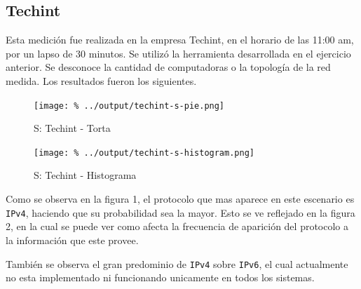 \documentclass[final,narroweqnarray,inline]{ieee}
\begin{document}
    \subsection{Techint}

    Esta medición fue realizada en la empresa Techint, en el horario de
    las 11:00 am, por un lapso de 30 minutos. Se utilizó la herramienta
    desarrollada en el ejercicio anterior. Se desconoce la cantidad de
    computadoras o la topología de la red medida. Los resultados fueron
    los siguientes.
    
    
    \begin{figure}[H]\begin{center}
      \texttt{[image: \%
      ../output/techint-s-pie.png]}
      \vspace{-3em}
      \caption{S: Techint - Torta}
      \label{techint-s-pie}
    \end{center}\end{figure}
 
     
    \begin{figure}[H]\begin{center}
      \texttt{[image: \%
      ../output/techint-s-histogram.png]}
      \caption{S: Techint - Histograma}
      \label{techint-s-histogram}
    \end{center}\end{figure}


    Como se observa en la figura 1, el protocolo que mas aparece en
    este escenario es \texttt{IPv4}, haciendo que su probabilidad sea 
    la mayor. Esto se ve reflejado en la figura 2, en la cual 
    se puede ver como afecta la frecuencia de aparición del protocolo a 
    la información que este provee.

    También se observa el gran predominio de \texttt{IPv4} sobre \texttt{IPv6},
    el cual actualmente no esta implementado ni funcionando unicamente en todos
    los sistemas.
\end{document}
